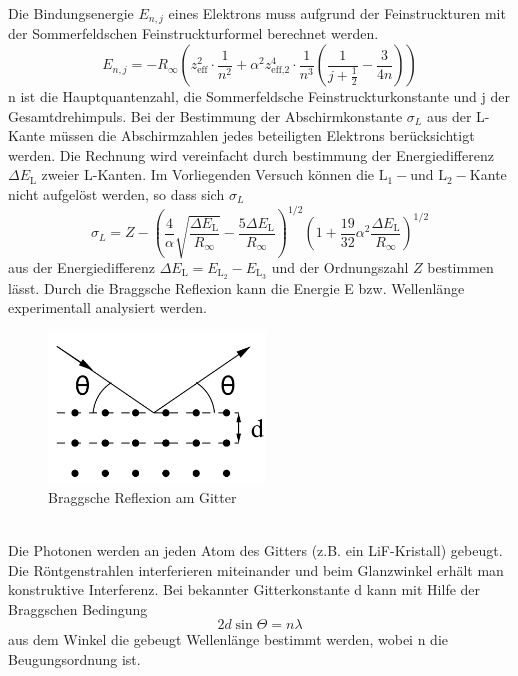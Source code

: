 \noindent
Die Bindungsenergie $E_{n,j}$ eines Elektrons muss aufgrund der Feinstruckturen mit der Sommerfeldschen Feinstruckturformel berechnet werden.
\begin{equation}
    E_{n,j} = -R_{\infty}\left(z_{\text{eff}}^2 \cdot \frac{1}{n^2} + \alpha^2 z_{\text{eff,2}}^4 \cdot \frac{1}{n^3} \left( \frac{1}{j + \frac{1}{2}} - \frac{3}{4n}\right)\right)
    \label{eqn:gl3}
\end{equation}
n ist die Hauptquantenzahl, \alpha die Sommerfeldsche Feinstruckturkonstante und j der Gesamtdrehimpuls.
Bei der Bestimmung der Abschirmkonstante ${\sigma}_L$ aus der L-Kante müssen die Abschirmzahlen jedes beteiligten Elektrons berücksichtigt werden.
Die Rechnung wird vereinfacht durch bestimmung der Energiedifferenz $\Delta E_{\text{L}}$ zweier L-Kanten.
Im Vorliegenden Versuch können die $\text{L}_1- \text{und L}_2-$Kante nicht aufgelöst werden, so dass sich ${\sigma}_L$
\begin{equation}
    {\sigma}_L = Z - \left(\frac{4}{\alpha}\sqrt{\frac{\Delta E_{\text{L}}}{R_{\infty}}} - \frac{5 \Delta E_{\text{L}}}{R_{\infty}}\right)^{1/2}\left(1 + \frac{19}{32}\alpha^2\frac{\Delta E_{\text{L}}}{R_{\infty}}\right)^{1/2}
    \label{eqn:gl3}
\end{equation}
aus der Energiedifferenz $\Delta E_{\text{L}} = E_{\text{$\text{L}_2$}} - E_{\text{$\text{L}_3$}}$ und der Ordnungszahl $Z$ bestimmen lässt.
Durch die Braggsche Reflexion kann die Energie E bzw. Wellenlänge \lambda experimentall analysiert werden.
\begin{figure}
    \centering
    \includegraphics[height=4.0cm]{data/abb3.jpg}
    \caption{Braggsche Reflexion am Gitter \cite{V602}}
    \label{fig:abb3}
\end{figure} \\
\noindent
Die Photonen werden an jeden Atom des Gitters (z.B. ein LiF-Kristall) gebeugt.
Die Röntgenstrahlen interferieren miteinander und beim Glanzwinkel \Theta erhält man konstruktive Interferenz.
Bei bekannter Gitterkonstante d kann mit Hilfe der Braggschen Bedingung
\begin{equation}
    2 d \sin{\Theta} = n \lambda
\end{equation}
aus dem Winkel \Theta die gebeugt Wellenlänge \lambda bestimmt werden, wobei n die Beugungsordnung ist.

